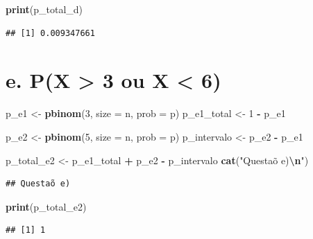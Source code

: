 \documentclass[
]{article}
\newenvironment{Shaded}{\begin{snugshade}}{\end{snugshade}}
\newcommand{\AttributeTok}[1]{\textcolor[rgb]{0.13,0.29,0.53}{#1}}
\newcommand{\DecValTok}[1]{\textcolor[rgb]{0.00,0.00,0.81}{#1}}
\newcommand{\FunctionTok}[1]{\textcolor[rgb]{0.13,0.29,0.53}{\textbf{#1}}}
\newcommand{\NormalTok}[1]{#1}
\newcommand{\OtherTok}[1]{\textcolor[rgb]{0.56,0.35,0.01}{#1}}
\newcommand{\SpecialCharTok}[1]{\textcolor[rgb]{0.81,0.36,0.00}{\textbf{#1}}}
\newcommand{\StringTok}[1]{\textcolor[rgb]{0.31,0.60,0.02}{#1}}
\begin{document}
\begin{Shaded}
\begin{Highlighting}[]
\FunctionTok{print}\NormalTok{(p\_total\_d)}
\end{Highlighting}
\end{Shaded}

\begin{verbatim}
## [1] 0.009347661
\end{verbatim}

\section{e. P(X \textgreater{} 3 ou X \textless{}
6)}\label{e.-px-3-ou-x-6}

\begin{Shaded}
\begin{Highlighting}[]
\NormalTok{p\_e1 }\OtherTok{\textless{}{-}} \FunctionTok{pbinom}\NormalTok{(}\DecValTok{3}\NormalTok{, }\AttributeTok{size =}\NormalTok{ n, }\AttributeTok{prob =}\NormalTok{ p)}
\NormalTok{p\_e1\_total }\OtherTok{\textless{}{-}} \DecValTok{1} \SpecialCharTok{{-}}\NormalTok{ p\_e1}

\NormalTok{p\_e2 }\OtherTok{\textless{}{-}} \FunctionTok{pbinom}\NormalTok{(}\DecValTok{5}\NormalTok{, }\AttributeTok{size =}\NormalTok{ n, }\AttributeTok{prob =}\NormalTok{ p)}
\NormalTok{p\_intervalo }\OtherTok{\textless{}{-}}\NormalTok{ p\_e2 }\SpecialCharTok{{-}}\NormalTok{ p\_e1}

\NormalTok{p\_total\_e2 }\OtherTok{\textless{}{-}}\NormalTok{ p\_e1\_total }\SpecialCharTok{+}\NormalTok{ p\_e2 }\SpecialCharTok{{-}}\NormalTok{ p\_intervalo}
\FunctionTok{cat}\NormalTok{(}\StringTok{"Questaõ e)}\SpecialCharTok{\textbackslash{}n}\StringTok{"}\NormalTok{)}
\end{Highlighting}
\end{Shaded}

\begin{verbatim}
## Questaõ e)
\end{verbatim}

\begin{Shaded}
\begin{Highlighting}[]
\FunctionTok{print}\NormalTok{(p\_total\_e2)}
\end{Highlighting}
\end{Shaded}

\begin{verbatim}
## [1] 1
\end{verbatim}
\end{document}
